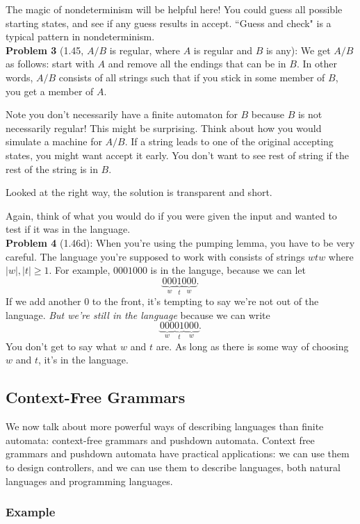 The magic of nondeterminism will be helpful here! You could guess all possible starting states, and see if any guess results in accept. ``Guess and check" is a typical pattern in nondeterminism.\\

\noindent
\textbf{Problem 3} (1.45, $A/B$ is regular, where $A$ is regular and $B$ is any):
We get $A/B$ as follows: start with $A$ and remove all the endings that can be in $B$. In other words, $A/B$ consists of all strings such that if you stick in some member of $B$, you get a member of $A$. 

Note you don't necessarily have a finite automaton for $B$ because $B$ is not necessarily regular! This might be surprising. Think about how you would simulate a machine for $A/B$. If a string leads to one of the original accepting states, you might want accept it early. You don't want to see rest of string if the rest of the string is in $B$.

Looked at the right way, the solution is transparent and short.

Again, think of what you would do if you were given the input and wanted to test if it was in the language.\\

\noindent\textbf{Problem 4} (1.46d): When you're using the pumping lemma, you have to be very careful. The language you're supposed to work with consists of strings $wtw$ where $|w|,|t|\ge 1$. For example, $0001000$ is in the languge, because we can let \[\underbrace{000}_w\underbrace{1}_t\underbrace{000}_w.\] 
If we add another 0 to the front, it's tempting to say we're not out of the language. {\it But we're still in the language} because we can write
\[
\underbrace{000}_w\underbrace{01}_t\underbrace{000}_w.
\]
You don't get to say what $w$ and $t$ are. As long as there is some way of choosing $w$ and $t$, it's in the language.
\subsection{Context-Free Grammars}
We now talk about more powerful ways of describing languages than finite automata: context-free grammars and pushdown automata. Context free grammars and pushdown automata have practical applications: we can use them to design controllers, and we can use them to describe languages, both natural languages and programming languages.

\subsubsection{Example}

